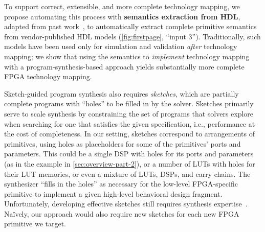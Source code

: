 To support
  correct, extensible, and more complete
  technology mapping, we propose
  automating this process with
  \textbf{semantics extraction from HDL}, 
  adapted from past work~\cite{daly2022synthesizing},
  to automatically extract
  complete primitive semantics
  from vendor-published HDL models
  (\cref{fig:firstpage}, ``input 3'').
Traditionally, such models have
   been used only 
  for
  simulation and validation
  \textit{after} technology mapping;
  we show that using the semantics
  to
  \textit{implement}
  technology mapping
  with a program-synthesis-based approach
  yields substantially more
  complete FPGA technology mapping.

Sketch-guided program synthesis also
  requires \textit{sketches}, which are 
  partially complete programs with ``holes'' to be filled in
  by the solver.
Sketches primarily serve to
  scale synthesis by
  constraining the set of programs that 
  solvers explore when searching for
  one that satisfies
  the given specification,
  i.e., performance at the cost of completeness.
In our setting,
  sketches correspond to
  arrangements of primitives,
  using holes
  as placeholders
  for some of the primitives' 
  ports and parameters.
This could be
  a single DSP with holes for
  its ports and parameters
  (as in the example in \cref{sec:overview-part-2}),
  or a number of LUTs with holes for their LUT memories,
  or even a mixture of LUTs, DSPs, and carry chains.
The synthesizer ``fills in the holes''
  as necessary for
  the low-level FPGA-specific primitive to implement
  a given high-level behavioral design fragment.
Unfortunately,
  developing effective sketches
  still requires synthesis expertise~\cite{10.1145/3140587.3062353,vanGeffenJITSynth}.
  Na\"ively, our approach would also
  require new sketches for each new
  FPGA primitive we target.



